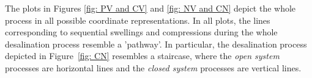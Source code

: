 \documentclass[journal,article,submit,pdftex,moreauthors]{Definitions/mdpi}
\newcommand{\ncl}{n_\mathrm{Cl^-}}
\newcommand{\gel}{^\mathrm{gel}}
\newcommand{\cl}{\mathrm{Cl^-}}
\newcommand{\cs}{c_{\mathrm{s}}}
\newcommand{\Vgel}{V_\mathrm{gel}}
\newcommand{\Pgel}{\Pi}
\begin{document}
The plots in Figures \ref{fig: PV and CV} and \ref{fig: NV and CN} depict the whole process in all possible coordinate representations.
In all plots, the lines corresponding to sequential swellings and compressions during the whole desalination process resemble a 'pathway'.
In particular, the desalination process depicted in Figure~\ref{fig: CN} resembles a staircase,
where the \emph{open system} processes are horizontal lines and the \emph{closed system} processes are vertical lines.








\end{document}
